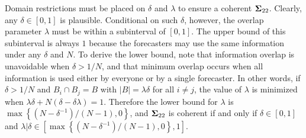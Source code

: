 \documentclass[12pt]{article}
\theoremstyle{definition}
\theoremstyle{definition}
\begin{document}
Domain restrictions must be placed on $\delta$ and $\lambda$ to ensure a coherent ${\bf\Sigma}_{22}$. Clearly, any $\delta \in [0,1]$ is plausible. Conditional on such $\delta$, however, the overlap parameter $\lambda$ must be within a subinterval of $[0,1]$. The upper bound of this subinterval is always $1$ because the 
forecasters may use the same information under any $\delta$ and $N$. To derive the lower bound, note that  
information overlap is unavoidable when $\delta > 1/N$, and that minimum
overlap occurs when all information is used either by everyone or
by a single forecaster.  In other words, if $\delta > 1/N$ and
$B_{i} \cap B_j = B$ with $|B| = \lambda \delta$ for all $i \neq j$,
the value of $\lambda$ is minimized when $\lambda\delta + N(\delta -
\delta\lambda) = 1$.  Therefore the lower bound for $\lambda$ is $\max
\left\{ (N-\delta^{-1})/(N-1), 0\right\}$, and ${\bf\Sigma}_{22}$ is
coherent if and only if $\delta \in [0,1]$  and $\lambda | \delta \in \left[  
   \max \left\{ (N-\delta^{-1})/(N-1), 0\right\}, 1 \right]$.
\end{document}
